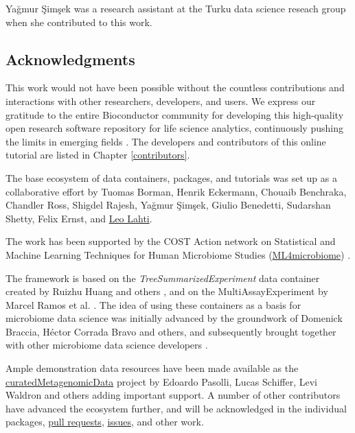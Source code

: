 \documentclass[
]{book}
\begin{document}
Yağmur Şimşek was a research assistant at the Turku data science reseach group when she contributed to this work.

\hypertarget{acknowledgments}{%
\subsection*{Acknowledgments}\label{acknowledgments}}

This work would not have been possible without the countless
contributions and interactions with other researchers, developers, and
users. We express our gratitude to the entire Bioconductor community
for developing this high-quality open research software repository for
life science analytics, continuously pushing the limits in emerging
fields \citep[\citet{Huber2015}]{Gentleman2004}. The developers and contributors
of this online tutorial are listed in Chapter \ref{contributors}.

The base ecosystem of data containers, packages, and tutorials was set
up as a collaborative effort by Tuomas Borman, Henrik Eckermann,
Chouaib Benchraka, Chandler Ross, Shigdel Rajesh, Yağmur Şimşek,
Giulio Benedetti, Sudarshan Shetty, Felix Ernst, and \href{http://www.iki.fi/Leo.Lahti}{Leo
Lahti}.

The work has been supported by the COST Action network on Statistical
and Machine Learning Techniques for Human Microbiome Studies
(\href{https://www.ml4microbiome.eu/}{ML4microbiome}) \citep{MorenoIndias2021}.

The framework is based on the \emph{TreeSummarizedExperiment} data
container created by Ruizhu Huang and others
\citep{R_TreeSummarizedExperiment}, and on the MultiAssayExperiment by
Marcel Ramos et al. \citep{Ramos2017}. The idea of using these containers
as a basis for microbiome data science was initially advanced by the
groundwork of Domenick Braccia, Héctor Corrada Bravo and others, and
subsequently brought together with other microbiome data science
developers \citep{Shetty2019}.

Ample demonstration data resources have been made available as the
\href{https://waldronlab.io/curatedMetagenomicData/}{curatedMetagenomicData}
project by Edoardo Pasolli, Lucas Schiffer, Levi Waldron and others
\citep{Pasolli2017} adding important support.
A number of other contributors have advanced the ecosystem
further, and will be acknowledged in the individual
packages, \href{https://github.com/microbiome/OMA/graphs/contributors}{pull
requests},
\href{https://github.com/microbiome/OMA/issues}{issues}, and other work.
\end{document}
